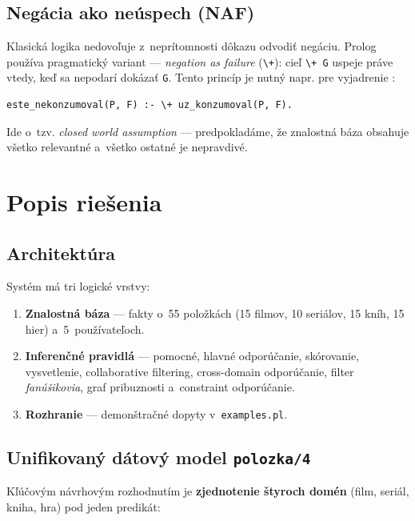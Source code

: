 \documentclass[11pt,a4paper]{article}
\begin{document}
\subsection{Negácia ako neúspech (NAF)}

Klasická logika nedovoľuje z~neprítomnosti dôkazu odvodiť
negáciu. Prolog používa pragmatický variant ---
\emph{negation as failure} (\texttt{\textbackslash+}): cieľ
\texttt{\textbackslash+ G} uspeje práve vtedy, keď sa nepodarí
dokázať \texttt{G}. Tento princíp je nutný napr. pre vyjadrenie
:

\begin{lstlisting}[numbers=none]
este_nekonzumoval(P, F) :- \+ uz_konzumoval(P, F).
\end{lstlisting}

\noindent Ide o~tzv. \emph{closed world assumption} ---
predpokladáme, že znalostná báza obsahuje všetko relevantné
a~všetko ostatné je nepravdivé.

\section{Popis riešenia}

\subsection{Architektúra}

Systém má tri logické vrstvy:

\begin{enumerate}[noitemsep]
  \item \textbf{Znalostná báza} --- fakty o~55 položkách
        (15 filmov, 10 seriálov, 15 kníh, 15 hier) a~5~používateľoch.
  \item \textbf{Inferenčné pravidlá} --- pomocné, hlavné
        odporúčanie, skórovanie, vysvetlenie, collaborative
        filtering, cross-domain odporúčanie, filter
        \emph{fanúšikovia}, graf pribuznosti a~constraint
        odporúčanie.
  \item \textbf{Rozhranie} --- demonštračné dopyty
        v~\texttt{examples.pl}.
\end{enumerate}

\subsection{Unifikovaný dátový model \texttt{polozka/4}}
\label{sec:dm}

Kľúčovým návrhovým rozhodnutím je \textbf{zjednotenie štyroch
domén} (film, seriál, kniha, hra) pod jeden predikát:
\end{document}
